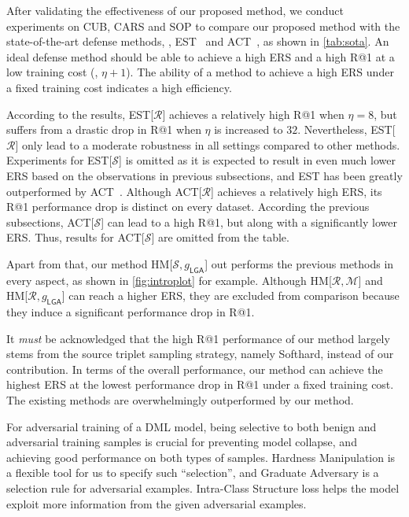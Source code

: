 \documentclass[10pt,twocolumn,letterpaper]{article}
\begin{document}
After validating the effectiveness of our proposed method, we conduct
experiments on CUB, CARS and SOP to compare our proposed method
with the state-of-the-art defense methods, \ie, EST~\cite{advrank}
and ACT~\cite{robrank}, as shown in \cref{tab:sota}.
%
An ideal defense method should be able to achieve a high ERS and a high R@1
at a low training cost (\ie, $\eta+1$).
%
The ability of a method to achieve a high ERS under a fixed training cost
indicates a high efficiency.

According to the results, EST[$\mathcal{R}$] achieves a relatively high R@1
when $\eta{=}8$, but suffers from a drastic drop in R@1 when $\eta$ is
increased to $32$.
%
Nevertheless, EST[$\mathcal{R}$] only lead to a moderate robustness in all
settings compared to other methods.
%
Experiments for EST[$\mathcal{S}$] is omitted as it is expected to result in
even much lower ERS based on the observations in previous subsections, and EST
has been greatly outperformed by ACT~\cite{robrank}.
%
Although ACT[$\mathcal{R}$] achieves a relatively high ERS, its R@1 performance
drop is distinct on every dataset.
%
According the previous subsections, ACT[$\mathcal{S}$] can lead to a high R@1,
but along with a significantly lower ERS.
%
Thus, results for ACT[$\mathcal{S}$] are omitted from the table.

Apart from that, our method HM[$\mathcal{S},g_\mathsf{LGA}$] out performs the
previous methods in every aspect, as shown in \cref{fig:introplot} for 
example.
%
Although HM[$\mathcal{R},\mathcal{M}$] and HM[$\mathcal{R},g_\mathsf{LGA}$] can reach
a higher ERS, they are excluded from comparison because they induce a
significant performance drop in R@1.

It \emph{must} be acknowledged that the high R@1 performance of our method
largely stems from the source triplet sampling strategy, namely Softhard,
instead of our contribution.
%
In terms of the overall performance, our method can achieve the highest ERS at
the lowest performance drop in R@1 under a fixed training cost.
%
The existing methods are overwhelmingly outperformed by our method.

\begin{comment}
\begin{figure}[t]
	\texttt{[image: sotaplot.pdf]}
	\caption{sota plot}
\end{figure}
\end{comment}

For adversarial training of a DML model, being selective to both benign and
adversarial training samples is crucial for preventing model collapse, and
achieving good performance on both types of samples.
%
Hardness Manipulation is a flexible tool for us to specify such ``selection'',
and Graduate Adversary is a selection rule for adversarial examples.
%
Intra-Class Structure loss helps the model exploit more information from the
given adversarial examples.
\end{document}
